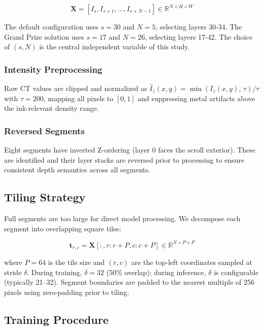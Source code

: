 \begin{equation}
\label{eq:zlayer_window}
\mathbf{X} = [I_s, I_{s+1}, \ldots, I_{s+N-1}] \in \mathbb{R}^{N \times H \times W}
\end{equation}

The default configuration uses $s = 30$ and $N = 5$, selecting layers 30-34. The Grand Prize solution uses $s = 17$ and $N = 26$, selecting layers 17-42. The choice of $(s, N)$ is the central independent variable of this study.

\subsubsection{Intensity Preprocessing}

Raw CT values are clipped and normalized as $\hat{I}_z(x, y) = \min(I_z(x, y),\,\tau)/\tau$ with $\tau = 200$, mapping all pixels to $[0, 1]$ and suppressing metal artifacts above the ink-relevant density range.

\subsubsection{Reversed Segments}

Eight segments have inverted Z-ordering (layer 0 faces the scroll exterior). These are identified and their layer stacks are reversed prior to processing to ensure consistent depth semantics across all segments.

\subsection{Tiling Strategy}
\label{sec:tiling}

Full segments are too large for direct model processing. We decompose each segment into overlapping square tiles:

\begin{equation}
\mathbf{t}_{r,c} = \mathbf{X}[:, r:r+P, c:c+P] \in \mathbb{R}^{N \times P \times P}
\end{equation}

\noindent where $P = 64$ is the tile size and $(r, c)$ are the top-left coordinates sampled at stride $\delta$. During training, $\delta = 32$ (50\% overlap); during inference, $\delta$ is configurable (typically 21--32). Segment boundaries are padded to the nearest multiple of 256 pixels using zero-padding prior to tiling.

\subsection{Training Procedure}
\label{sec:training}

